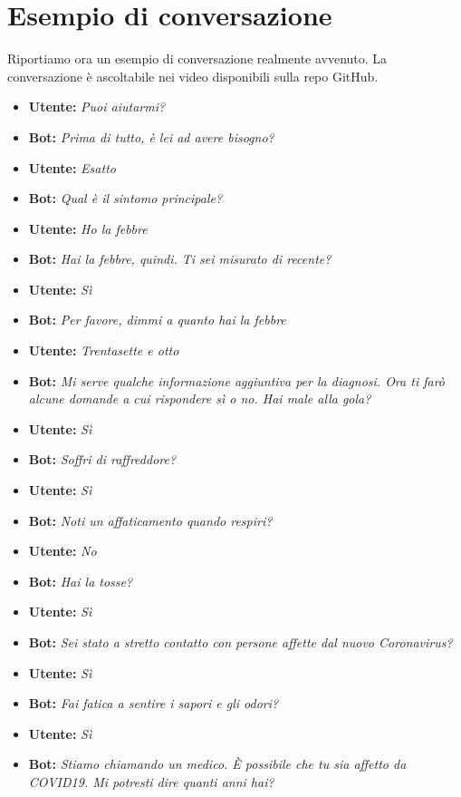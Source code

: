 \section{Esempio di conversazione}
Riportiamo ora un esempio di conversazione realmente avvenuto. La conversazione è ascoltabile nei video disponibili sulla repo GitHub\cite{media:videos}.
\begin{itemize}
    \item \textbf{Utente:} \textit{Puoi aiutarmi?}
    \item \textbf{Bot:} \textit{Prima di tutto, è lei ad avere bisogno?}
    \item \textbf{Utente:} \textit{Esatto}
    \item \textbf{Bot:} \textit{Qual è il sintomo principale?}
    \item \textbf{Utente:} \textit{Ho la febbre}
    \item \textbf{Bot:} \textit{Hai la febbre, quindi. Ti sei misurato di recente?}
    \item \textbf{Utente:} \textit{Sì}
    \item \textbf{Bot:} \textit{Per favore, dimmi a quanto hai la febbre}
    \item \textbf{Utente:} \textit{Trentasette e otto}
    \item \textbf{Bot:} \textit{Mi serve qualche informazione aggiuntiva per la diagnosi. Ora ti farò alcune domande a cui rispondere sì o no. Hai male alla gola?}
    \item \textbf{Utente:} \textit{Sì}
    \item \textbf{Bot:} \textit{Soffri di raffreddore?}
    \item \textbf{Utente:} \textit{Sì}
    \item \textbf{Bot:} \textit{Noti un affaticamento quando respiri?}
    \item \textbf{Utente:} \textit{No}
    \item \textbf{Bot:} \textit{Hai la tosse?}
    \item \textbf{Utente:} \textit{Sì}
    \item \textbf{Bot:} \textit{Sei stato a stretto contatto con persone affette dal nuovo Coronavirus?}
    \item \textbf{Utente:} \textit{Sì}
    \item \textbf{Bot:} \textit{Fai fatica a sentire i sapori e gli odori?}
    \item \textbf{Utente:} \textit{Sì}
    \item \textbf{Bot:} \textit{Stiamo chiamando un medico. È possibile che tu sia affetto da COVID19. Mi potresti dire quanti anni hai?}

\end{itemize}
